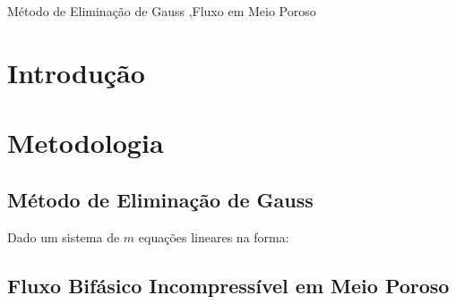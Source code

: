 \documentclass[final,5p]{elsarticle}
\numberwithin{equation}{section}
\begin{document}
\begin{frontmatter}
\begin{abstract}
\end{abstract}




\begin{keyword}
    Método de Eliminação de Gauss \sep Fluxo em Meio Poroso



\end{keyword}

\end{frontmatter}


\section{Introdução}



\section{Metodologia}

    \subsection{Método de Eliminação de Gauss}

        Dado um sistema de $m$ equações lineares na forma:



    \subsection{Fluxo Bifásico Incompressível em Meio Poroso}
\end{document}
